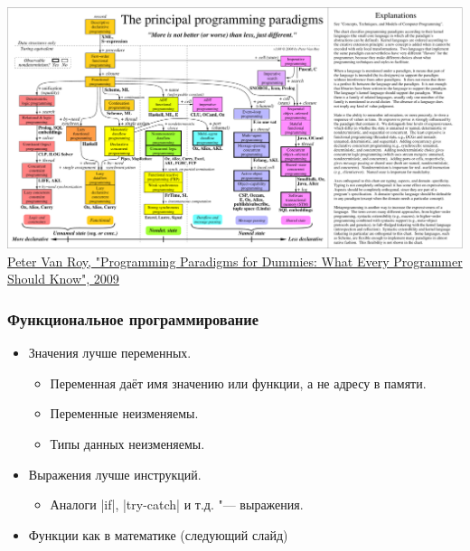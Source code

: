 \documentclass[10pt]{beamer}
\begin{document}
\begin{frame}
  \includegraphics[trim={0 0 144mm -2mm},clip,width=\textwidth,height=\textheight,keepaspectratio]{paradigmsDIAGRAMeng108.pdf}
  \footnotesize  \href{https://www.info.ucl.ac.be/~pvr/paradigms.html}{Peter Van Roy, "Programming Paradigms for Dummies: What Every Programmer Should Know", 2009}
\end{frame}

\begin{frame}
  \frametitle{Функциональное программирование}
  \begin{itemize}
    \item Значения лучше переменных.
          \begin{itemize}
            \item Переменная даёт имя значению или функции, а не адресу в памяти.
            \item Переменные неизменяемы.
            \item Типы данных неизменяемы.
          \end{itemize}
    \item Выражения лучше инструкций.
          \begin{itemize}
            \item Аналоги \haskinline|if|, \haskinline|try-catch| и т.д. "--- выражения.
          \end{itemize}
    \item Функции как в математике (следующий слайд)
  \end{itemize}
\end{frame}
\end{document}
